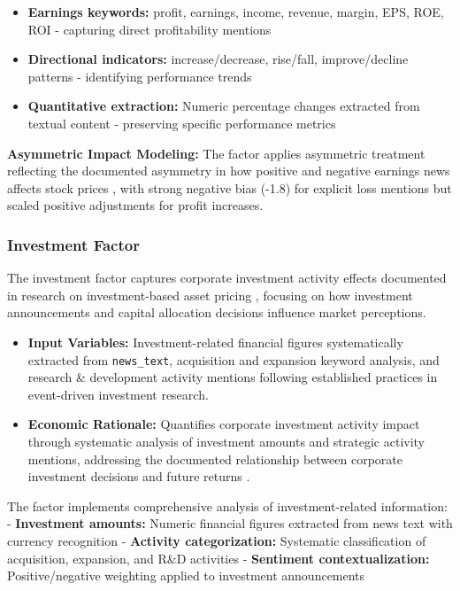 \documentclass[3p,times,procedia]{elsarticle}
\begin{document}
\begin{itemize}
    \item \textbf{Earnings keywords:} profit, earnings, income, revenue, margin, EPS, ROE, ROI - capturing direct profitability mentions
    \item \textbf{Directional indicators:} increase/decrease, rise/fall, improve/decline patterns - identifying performance trends
    \item \textbf{Quantitative extraction:} Numeric percentage changes extracted from textual content - preserving specific performance metrics
\end{itemize}

\textbf{Asymmetric Impact Modeling:} The factor applies asymmetric treatment reflecting the documented asymmetry in how positive and negative earnings news affects stock prices \cite{Kothari2009}, with strong negative bias (-1.8) for explicit loss mentions but scaled positive adjustments for profit increases.

\subsubsection{{Investment Factor}}

The investment factor captures corporate investment activity effects documented in research on investment-based asset pricing \cite{Daniel1998}, focusing on how investment announcements and capital allocation decisions influence market perceptions.

\begin{itemize}
    \item \textbf{Input Variables:} Investment-related financial figures systematically extracted from \texttt{news\_text}, acquisition and expansion keyword analysis, and research \& development activity mentions following established practices in event-driven investment research.
    \item \textbf{Economic Rationale:} Quantifies corporate investment activity impact through systematic analysis of investment amounts and strategic activity mentions, addressing the documented relationship between corporate investment decisions and future returns \cite{Daniel1998}.
\end{itemize}

The factor implements comprehensive analysis of investment-related information:
- \textbf{Investment amounts:} Numeric financial figures extracted from news text with currency recognition
- \textbf{Activity categorization:} Systematic classification of acquisition, expansion, and R\&D activities
- \textbf{Sentiment contextualization:} Positive/negative weighting applied to investment announcements
\end{document}
